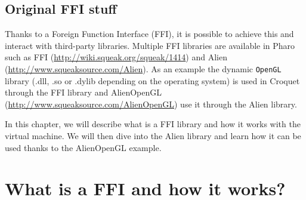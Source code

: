 \documentclass[a4paper,10pt,twoside]{book}
\begin{document}
% 
% 
% 

\newpage
\subsection{Original FFI stuff}

Thanks to a Foreign Function Interface (FFI), it is possible to achieve this and interact with third-party libraries.
Multiple FFI libraries are available in Pharo such as FFI (\url{http://wiki.squeak.org/squeak/1414}) and Alien (\url{http://www.squeaksource.com/Alien}).
As an example the dynamic \texttt{OpenGL} library (.dll, .so or .dylib depending on the operating system) is used in Croquet through the FFI library and AlienOpenGL (\url{http://www.squeaksource.com/AlienOpenGL}) use it through the Alien library.

In this chapter, we will describe what is a FFI library and how it works with the virtual machine. 
We will then dive into the Alien library and learn how it can be used thanks to the AlienOpenGL example.

\section{What is a FFI and how it works?}
\end{document}
